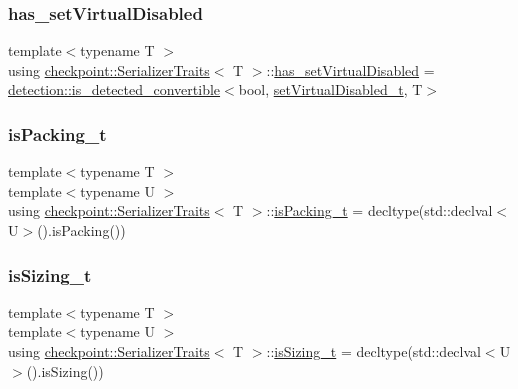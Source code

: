 \subsubsection{\texorpdfstring{has\+\_\+set\+Virtual\+Disabled}{has\_setVirtualDisabled}}
{\footnotesize\ttfamily template$<$typename T $>$ \\
using \hyperlink{structcheckpoint_1_1_serializer_traits}{checkpoint\+::\+Serializer\+Traits}$<$ T $>$\+::\hyperlink{structcheckpoint_1_1_serializer_traits_adba95a75d3573b6d8d11bf9d2300a9ca}{has\+\_\+set\+Virtual\+Disabled} =  \hyperlink{namespacedetection_afb970b23e39cfecb33449d40242c49ff}{detection\+::is\+\_\+detected\+\_\+convertible}$<$bool, \hyperlink{structcheckpoint_1_1_serializer_traits_ac8e1715e588932dc8e4dc14130b6ca9e}{set\+Virtual\+Disabled\+\_\+t}, T$>$}

\mbox{\label{structcheckpoint_1_1_serializer_traits_aeec71e5f15a9dc7e8a265d40a65518b0}} 
\subsubsection{\texorpdfstring{is\+Packing\+\_\+t}{isPacking\_t}}
{\footnotesize\ttfamily template$<$typename T $>$ \\
template$<$typename U $>$ \\
using \hyperlink{structcheckpoint_1_1_serializer_traits}{checkpoint\+::\+Serializer\+Traits}$<$ T $>$\+::\hyperlink{structcheckpoint_1_1_serializer_traits_aeec71e5f15a9dc7e8a265d40a65518b0}{is\+Packing\+\_\+t} =  decltype(std\+::declval$<$U$>$().is\+Packing())}

\mbox{\label{structcheckpoint_1_1_serializer_traits_a7b2ce347c816a50063e37b1216076814}} 
\subsubsection{\texorpdfstring{is\+Sizing\+\_\+t}{isSizing\_t}}
{\footnotesize\ttfamily template$<$typename T $>$ \\
template$<$typename U $>$ \\
using \hyperlink{structcheckpoint_1_1_serializer_traits}{checkpoint\+::\+Serializer\+Traits}$<$ T $>$\+::\hyperlink{structcheckpoint_1_1_serializer_traits_a7b2ce347c816a50063e37b1216076814}{is\+Sizing\+\_\+t} =  decltype(std\+::declval$<$U$>$().is\+Sizing())}

